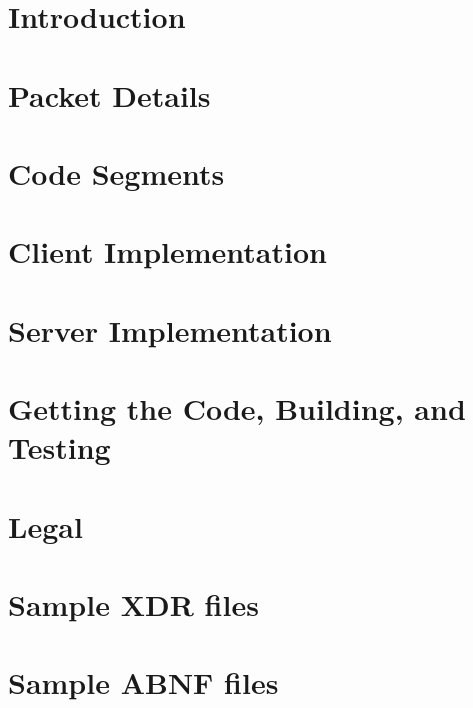 \documentclass[2pt]{book}
\begin{document}
\tableofcontents
\listoffigures
\listoftables

\mainmatter
\chapter{Introduction}

\chapter{Packet Details}
\chapter{Code Segments}








\chapter{Client Implementation}

\chapter{Server Implementation}

\chapter{Getting the Code, Building, and Testing}



\chapter{Legal}

\appendix
\chapter{Sample XDR files}
\chapter{Sample ABNF files}
\end{document}
